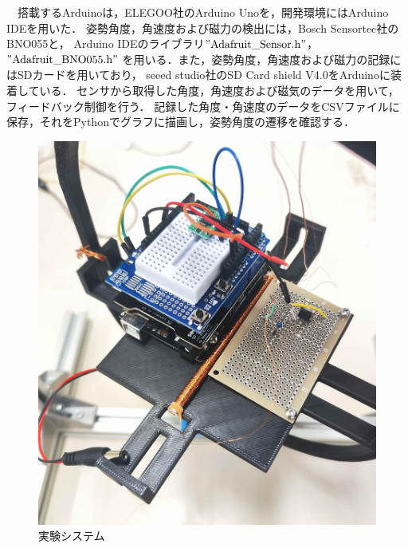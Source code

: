 　搭載するArduinoは，ELEGOO社のArduino Unoを，開発環境にはArduino IDEを用いた．
姿勢角度，角速度および磁力の検出には，Bosch Sensortec社のBNO055と，
Arduino IDEのライブラリ$"\mathrm{Adafruit\_Sensor.h}"$，$"\mathrm{Adafruit\_BNO055.h}"$
を用いる．また，姿勢角度，角速度および磁力の記録にはSDカードを用いており，
seeed studio社のSD Card shield V4.0をArduinoに装着している．
センサから取得した角度，角速度および磁気のデータを用いて，フィードバック制御を行う．
記録した角度・角速度のデータをCSVファイルに保存，それをPythonでグラフに描画し，姿勢角度の遷移を確認する．

\begin{figure}[H]
	\centering
		\includegraphics[scale=0.1]{./figure/実験システム.jpg}
		\caption{実験システム}
		\label{fig:system}
\end{figure}

